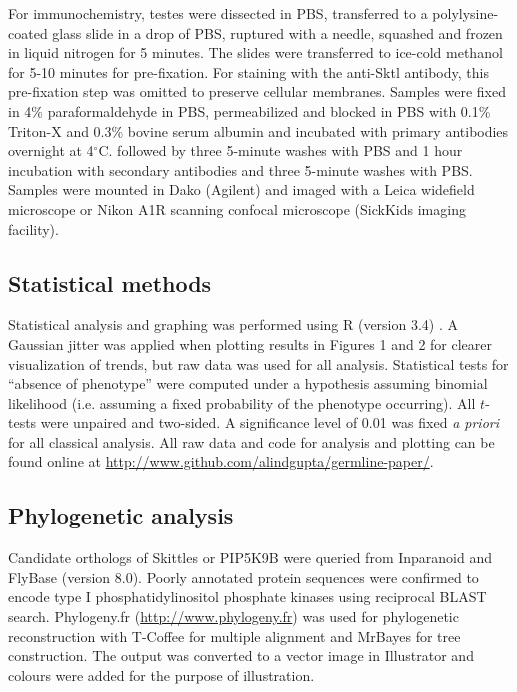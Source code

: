 \documentclass[12pt, twoside, letterpaper]{article}
\begin{document}
\begin{doublespacing}
\begin{linenumbers}
    For immunochemistry, testes were dissected in PBS,
    transferred to a polylysine-coated glass slide in a drop of PBS,
    ruptured with a needle, squashed and frozen in liquid nitrogen for 5 minutes.
    The slides were transferred to ice-cold methanol for 5-10 minutes for pre-fixation.
    For staining with the anti-Sktl antibody, this pre-fixation step
    was omitted to preserve cellular membranes.
    Samples were fixed in 4\% paraformaldehyde in PBS,
    permeabilized and blocked in PBS with 0.1\% Triton-X and 0.3\% bovine
    serum albumin and incubated with primary antibodies overnight at 4$^{\circ}$C.
    followed by three 5-minute washes with PBS and 1 hour incubation
    with secondary antibodies and three 5-minute washes with PBS.
    Samples were mounted in Dako (Agilent) and imaged with
    a Leica widefield microscope
    or Nikon A1R scanning confocal microscope (SickKids imaging facility).

    \subsection{Statistical methods}
    Statistical analysis and graphing was performed using R (version 3.4)
    \citep{r}.
    A Gaussian jitter was applied when plotting
    results in Figures 1 and 2 for clearer visualization of trends,
    but raw data was used for all analysis.
    Statistical tests for ``absence of phenotype'' were computed under a
    hypothesis assuming binomial likelihood (i.e. assuming a fixed probability of the
    phenotype occurring).
    All $t$-tests were unpaired and two-sided.
    A significance level of 0.01 was fixed \textit{a priori} for all classical analysis.
    All raw data and code for analysis and plotting can be found online
    at \url{http://www.github.com/alindgupta/germline-paper/}.

    \subsection{Phylogenetic analysis}
    Candidate orthologs of Skittles or PIP5K9B were queried
    from Inparanoid and FlyBase (version 8.0).
    Poorly annotated protein sequences were confirmed
    to encode type I phosphatidylinositol phosphate
    kinases using reciprocal BLAST search.
    Phylogeny.fr (\url{http://www.phylogeny.fr}) was used for
    phylogenetic reconstruction with T-Coffee for multiple alignment
    and MrBayes for tree construction.
    The output was converted to a vector image in Illustrator
    and colours were added for the purpose of illustration.


\end{linenumbers}
\end{doublespacing}
\end{document}
